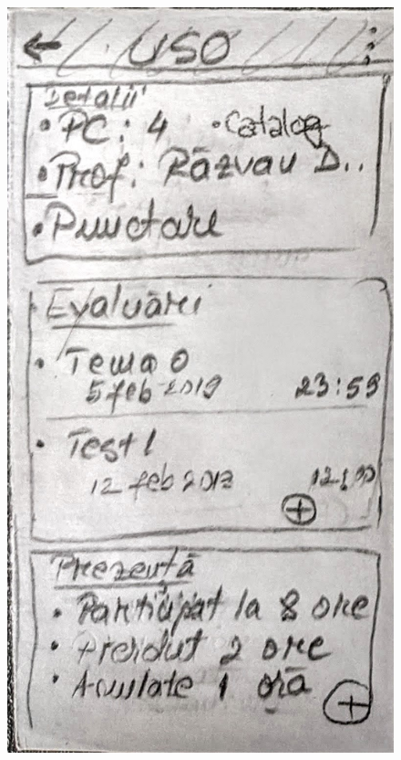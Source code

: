 \begin{figure}[ht]
         \includegraphics[height=0.279\textheight]{figures/app/paper/class_info.jpg}

\end{figure}
